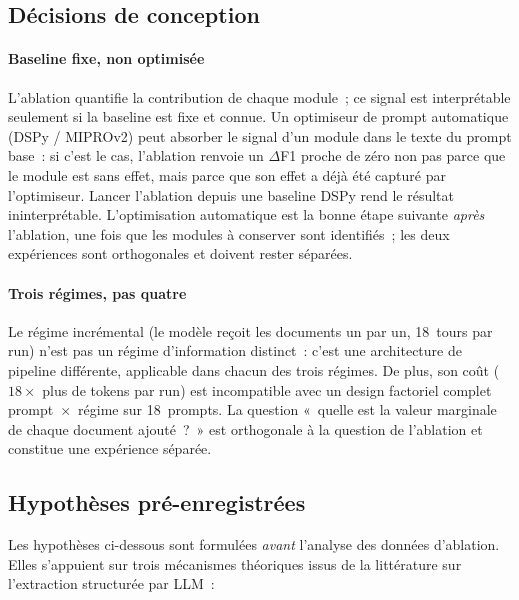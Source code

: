 \subsection{Décisions de conception}\label{sec:decisions-conception}

\paragraph{Baseline fixe, non optimisée}

L'ablation quantifie la contribution de chaque module~; ce signal est
interprétable seulement si la baseline est fixe et connue. Un optimiseur
de prompt automatique (DSPy / MIPROv2) peut absorber le signal d'un module
dans le texte du prompt base~: si c'est le cas, l'ablation renvoie un
$\Delta$F1 proche de zéro non pas parce que le module est sans effet,
mais parce que son effet a déjà été capturé par l'optimiseur. Lancer
l'ablation depuis une baseline DSPy rend le résultat ininterprétable.
L'optimisation automatique est la bonne étape suivante \emph{après}
l'ablation, une fois que les modules à conserver sont identifiés~;
les deux expériences sont orthogonales et doivent rester séparées.

\paragraph{Trois régimes, pas quatre}

Le régime incrémental (le modèle reçoit les documents un par un,
18~tours par run) n'est pas un régime d'information distinct~: c'est
une architecture de pipeline différente, applicable dans chacun des
trois régimes. De plus, son coût ($18\times$ plus de tokens par run)
est incompatible avec un design factoriel complet prompt~$\times$~régime
sur 18~prompts. La question «~quelle est la valeur marginale de chaque
document ajouté~?~» est orthogonale à la question de l'ablation et
constitue une expérience séparée.

\subsection{Hypothèses pré-enregistrées}\label{sec:hypotheses-ablation}

Les hypothèses ci-dessous sont formulées \emph{avant} l'analyse des données
d'ablation. Elles s'appuient sur trois mécanismes théoriques issus de la
littérature sur l'extraction structurée par LLM~:


